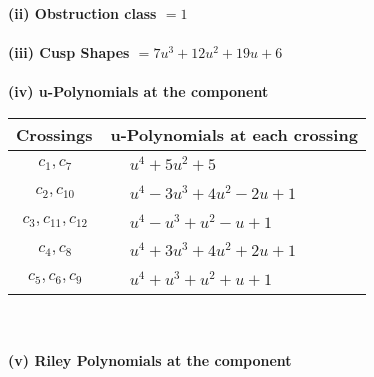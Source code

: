 \documentclass[1p]{elsarticle_modified}
\theoremstyle{definition}
\begin{document}
\flushleft \textbf{(ii) Obstruction class $= 1$}\\~\\
\flushleft \textbf{(iii) Cusp Shapes $= 7 u^3+12 u^2+19 u+6$}\\~\\
\newpage\renewcommand{\arraystretch}{1}
\flushleft \textbf{(iv) u-Polynomials at the component}\newline \\
\begin{tabular}{m{50pt}|m{274pt}}
Crossings & \hspace{64pt}u-Polynomials at each crossing \\
\hline $$\begin{aligned}c_{1},c_{7}\end{aligned}$$&$\begin{aligned}
&u^4+5 u^2+5
\end{aligned}$\\
\hline $$\begin{aligned}c_{2},c_{10}\end{aligned}$$&$\begin{aligned}
&u^4-3 u^3+4 u^2-2 u+1
\end{aligned}$\\
\hline $$\begin{aligned}c_{3},c_{11},c_{12}\end{aligned}$$&$\begin{aligned}
&u^4- u^3+u^2- u+1
\end{aligned}$\\
\hline $$\begin{aligned}c_{4},c_{8}\end{aligned}$$&$\begin{aligned}
&u^4+3 u^3+4 u^2+2 u+1
\end{aligned}$\\
\hline $$\begin{aligned}c_{5},c_{6},c_{9}\end{aligned}$$&$\begin{aligned}
&u^4+u^3+u^2+u+1
\end{aligned}$\\
\hline
\end{tabular}\\~\\
\newpage\renewcommand{\arraystretch}{1}
\flushleft \textbf{(v) Riley Polynomials at the component}\newline \\
\end{document}

